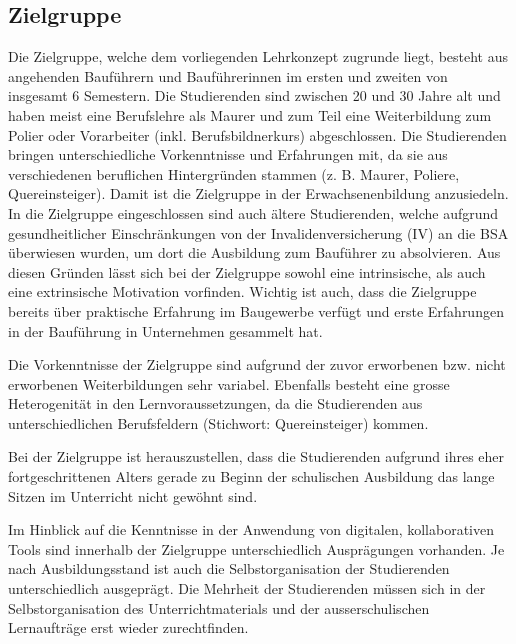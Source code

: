 \documentclass[
11pt,
captions=tableheading,
smallheadings,
headsepline,
footsepline, 
parskip=half-,
]{scrartcl}
\begin{document}
\subsection{Zielgruppe}
Die Zielgruppe, welche dem vorliegenden Lehrkonzept zugrunde liegt, besteht aus angehenden Bauführern und Bauführerinnen im ersten und zweiten  von  insgesamt 6 Semestern. Die Studierenden sind zwischen 20 und 30 Jahre alt und haben meist eine Berufslehre als Maurer und zum Teil eine Weiterbildung zum Polier oder Vorarbeiter (inkl. Berufsbildnerkurs) abgeschlossen. 
Die Studierenden bringen unterschiedliche Vorkenntnisse und Erfahrungen mit, da sie aus verschiedenen beruflichen Hintergründen stammen (z. B. Maurer, Poliere, Quereinsteiger). Damit ist die Zielgruppe in der Erwachsenenbildung anzusiedeln. In die Zielgruppe eingeschlossen sind auch ältere Studierenden, welche aufgrund gesundheitlicher Einschränkungen von der Invalidenversicherung (IV) an die BSA überwiesen wurden, um dort die Ausbildung zum Bauführer zu absolvieren. Aus diesen Gründen lässt sich bei der Zielgruppe sowohl eine intrinsische, als auch eine extrinsische Motivation vorfinden. 
Wichtig ist auch, dass die Zielgruppe bereits über praktische Erfahrung im Baugewerbe verfügt und erste Erfahrungen in der Bauführung in Unternehmen gesammelt hat. 

Die Vorkenntnisse der Zielgruppe sind aufgrund der zuvor erworbenen bzw. nicht erworbenen Weiterbildungen sehr variabel. Ebenfalls besteht eine grosse Heterogenität in den Lernvoraussetzungen, da die Studierenden aus unterschiedlichen Berufsfeldern (Stichwort: Quereinsteiger) kommen.

Bei der Zielgruppe ist herauszustellen, dass die Studierenden aufgrund ihres eher fortgeschrittenen Alters gerade zu Beginn der schulischen Ausbildung das lange Sitzen im Unterricht nicht gewöhnt sind.

Im Hinblick auf die Kenntnisse in der Anwendung von digitalen, kollaborativen Tools sind innerhalb der Zielgruppe unterschiedlich Ausprägungen vorhanden. Je nach Ausbildungsstand ist auch die Selbstorganisation der Studierenden unterschiedlich ausgeprägt. Die Mehrheit der  Studierenden müssen sich in der Selbstorganisation des Unterrichtmaterials und der ausserschulischen Lernaufträge erst wieder zurechtfinden.
\end{document}

